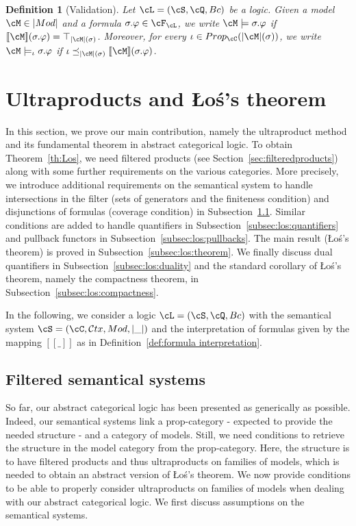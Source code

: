 \documentclass[preprint,3p,times]{elsarticle}
\newtheorem{definition}{Definition}[section]
\def\sem#1{[\![ #1 ] \!]}
\newcommand{\Ctx}{\mathcal{C}tx}
\newcommand{\Los}{\L{}o{\'s}}
\begin{document}
\begin{definition}[Validation]
\label{def:validation}
Let $\cL = (\cS,\cQ,Bc)$ be a logic. Given a model $\cM \in |Mod|$ and a formula $\sigma.\varphi \in \cF_\cL$, we write $\cM \models \sigma.\varphi$ if $\sem{\cM}(\sigma.\varphi) = \top_{|\cM|(\sigma)}$. Moreover, for every $\iota \in Prop_\cC(|\cM|(\sigma))$, we write $\cM \models_\iota \sigma.\varphi$ if $\iota \preceq_{|\cM|(\sigma)} \sem{\cM}(\sigma.\varphi)$. 
\end{definition}

\section{Ultraproducts and \Los's theorem}
\label{sec:ultraproduct}

In this section, we prove our main contribution, namely the ultraproduct method and its fundamental theorem in abstract categorical logic. To obtain Theorem~\ref{th:Los}, we need filtered products (see Section~\ref{sec:filteredproducts}) along with some further requirements on the various categories. More precisely, we introduce additional requirements on the semantical system to handle intersections in the filter (sets of generators and the finiteness condition) and disjunctions of formulas (coverage condition) in Subsection~\ref{subsec:los:systems}. Similar conditions are added to handle quantifiers in Subsection~\ref{subsec:los:quantifiers} and pullback functors in Subsection~\ref{subsec:los:pullbacks}.
The main result (\Los's theorem) is proved in Subsection~\ref{subsec:los:theorem}.
We finally discuss dual quantifiers in Subsection~\ref{subsec:los:duality} and the standard corollary of \Los's theorem, namely the compactness theorem, in Subsection~\ref{subsec:los:compactness}.

In the following, we consider a logic \(\cL = (\cS,\cQ,Bc)\) with the semantical system \(\cS = (\cC,\Ctx,Mod,|\_|)\) and the interpretation of formulas given by the mapping \(\sem{\_}\) as in Definition~\ref{def:formula interpretation}.

\subsection{Filtered semantical systems}
\label{subsec:los:systems}
So far, our abstract categorical logic has been presented as generically as possible. 
Indeed, our semantical systems link a prop-category - expected to provide the needed structure - and a category of models. Still, we need conditions to retrieve the structure in the model category from the prop-category. Here, the structure is to have filtered products and thus ultraproducts on families of models, which is needed to obtain an abstract version of \Los's theorem.
We now provide conditions to be able to properly consider ultraproducts on families of models when dealing with our abstract categorical logic. We first discuss assumptions on the semantical systems.
\end{document}
